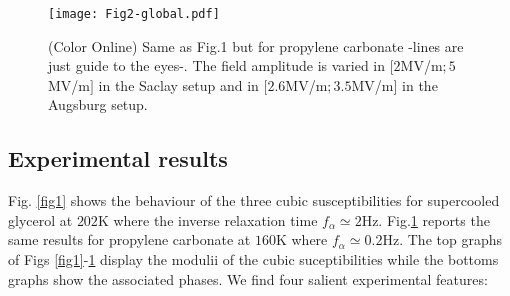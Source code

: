 \documentclass[single column,pre]{revtex4}
\begin{document}
\begin{figure}[t] 
\texttt{[image: Fig2-global.pdf]}
\caption{(Color Online) Same as Fig.1 but for propylene carbonate -lines are just guide to the eyes-. The field amplitude is varied in $[2$MV/m$;5$MV/m$]$ in the Saclay setup and in $[2.6$MV/m$;3.5$MV/m$]$ in the Augsburg setup.} 
\label{fig2}
\end{figure}


\subsection{\label{part2-2} Experimental results}

Fig. \ref{fig1} shows the behaviour of the three cubic susceptibilities for supercooled glycerol at $202$K where the inverse relaxation time $f_{\alpha} \simeq 2$Hz. Fig.\ref{fig2} reports the same results for propylene carbonate at $160$K where $f_{\alpha} \simeq 0.2$Hz. The top graphs of Figs \ref{fig1}-\ref{fig2} display the modulii of the cubic suceptibilities while the bottoms graphs show the associated phases. We find four salient experimental features:
\end{document}
